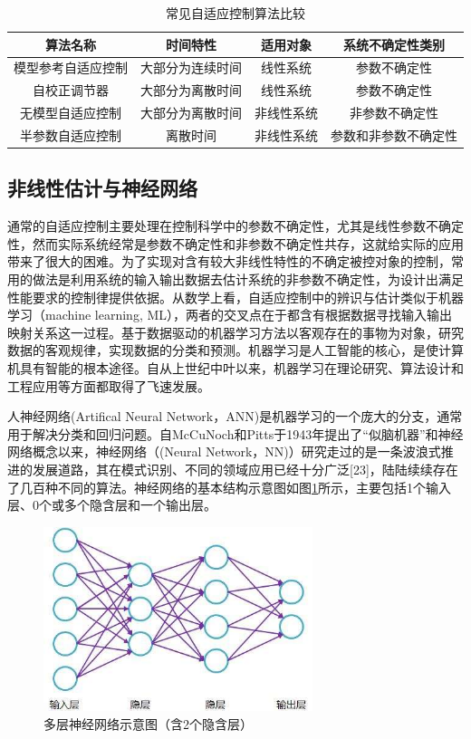 \begin{table}\centering
\caption{常见自适应控制算法比较}\label{tab:adaptive}
\begin{tabular}{|c|c|c|c|}\hline
算法名称 & 时间特性 & 适用对象 & 系统不确定性类别 \\ \hline
模型参考自适应控制 &  大部分为连续时间 & 线性系统 & 参数不确定性\\ \hline
自校正调节器 &  大部分为离散时间 & 线性系统 & 参数不确定性\\ \hline
无模型自适应控制 & 大部分为离散时间  & 非线性系统 & 非参数不确定性\\ \hline
半参数自适应控制 & 离散时间  & 非线性系统 & 参数和非参数不确定性\\ \hline
\end{tabular}
\end{table}

\subsection{非线性估计与神经网络}%

通常的自适应控制主要处理在控制科学中的参数不确定性，尤其是线性参数不确定性，然而实际系统经常是参数不确定性和非参数不确定性共存，这就给实际的应用带来了很大的困难。为了实现对含有较大非线性特性的不确定被控对象的控制，常用的做法是利用系统的输入输出数据去估计系统的非参数不确定性，为设计出满足性能要求的控制律提供依据。从数学上看，自适应控制中的辨识与估计类似于机器学习（machine learning, ML），两者的交叉点在于都含有根据数据寻找输入输出映射关系这一过程。基于数据驱动的机器学习方法以客观存在的事物为对象，研究数据的客观规律，实现数据的分类和预测。机器学习是人工智能的核心，是使计算机具有智能的根本途径。自从上世纪中叶以来，机器学习在理论研究、算法设计和工程应用等方面都取得了飞速发展。

人神经网络(Artifical Neural Network，ANN)是机器学习的一个庞大的分支，通常用于解决分类和回归问题。自McCuNoch和Pitts于1943年提出了“似脑机器”和神经网络概念以来，神经网络（(Neural Network，NN)）研究走过的是一条波浪式推进的发展道路，其在模式识别、不同的领域应用已经十分广泛[23]，陆陆续续存在了几百种不同的算法。神经网络的基本结构示意图如图\ref{fig:MNN}所示，主要包括1个输入层、0个或多个隐含层和一个输出层。

\begin{figure}
 \centering
 \includegraphics[width=0.7\textwidth]{figures/NN.jpg}
 \caption{多层神经网络示意图（含2个隐含层）}\label{fig:MNN}
\end{figure}

